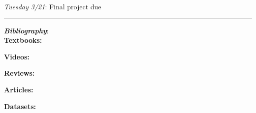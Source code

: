 \documentclass[12pt]{article}
\begin{document}
\emph{Tuesday 3/21}: Final project due

\begin{center}
	\rule{\textwidth}{0.5pt}
\end{center}

\noindent\textbf{\emph{Bibliography}}:\\

\textbf{Textbooks:}

\newrefsection
\nocite{Mehta:2019,Abu-Mostafa:2012,Erdman:2021,Zeljko:2014,Calafiura:2022,Chollet:2021}
\printbibliography[heading=none]

\textbf{Videos:}

\newrefsection
\nocite{3blue1brown_neuralnetwork,3blue1brown_gradientdescent}
\printbibliography[heading=none]

\textbf{Reviews:}

\newrefsection
\nocite{Carleo:2019ptp}
\printbibliography[heading=none]

\textbf{Articles:}

\newrefsection
\nocite{deOliveira:2015xxd,Aurisano:2016jvx,Komiske:2016rsd,Khan:2018opv,Zhou:2019,Moreno:2019neq,Ormiston:2020ele,Moreno:2021fvp}
\printbibliography[heading=none]

\textbf{Datasets:}

\newrefsection
\nocite{kasieczka_gregor_2019_2603256,hbb_dataset,galaxy-zoo-the-galaxy-challenge,g2net-gravitational-wave-detection,trackml-particle-identification}
\printbibliography[heading=none]
\end{document}
